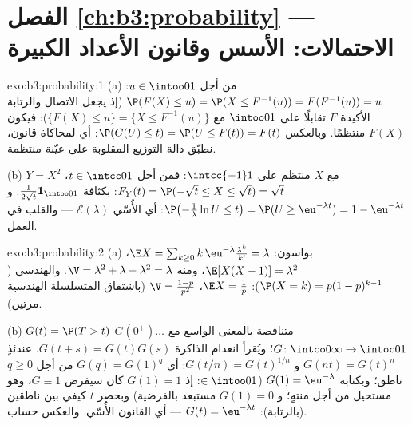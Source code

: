 \section*{الفصل \ref{ch:b3:probability} --- الاحتمالات: الأسس
وقانون الأعداد الكبيرة}

\begin{solution}{exo:b3:probability:1}
(a) من أجل $u \in \intoo01$: $\P(F(X) \leq u) = \P(X \leq
F^{-1}(u)) = F(F^{-1}(u)) = u$ (إذ يجعل الاتصال والرتابة
الأكيدة $F$ تقابلًا على $\intoo01$ مع $\{F(X) \leq u\} = \{X \leq F^{-1}(u)\}$): فيكون $F(X)$
منتظمًا. وبالعكس $\P(G(U) \leq t) = \P(U \leq F(t)) = F(t)$: أي لمحاكاة قانون، نطبّق دالة التوزيع
المقلوبة على عيّنة منتظمة.

(b) $Y = X^2$ مع $X$ منتظم على $\intcc{-1}1$: فمن أجل $t \in
\intcc01$،
$F_Y(t) = \P(-\sqrt t \leq X \leq \sqrt t) = \sqrt
t$: بكثافة $\frac1{2\sqrt t}\mathbf 1_{\intoo01}$. و $\P\bigl(-\frac1\lambda\ln U \leq t\bigr) = \P(U \geq
\eu^{-\lambda t}) = 1 - \eu^{-\lambda t}$: أي الأُسّي $\mathcal E(\lambda)$ --- والقلب في
العمل.
\end{solution}

\begin{solution}{exo:b3:probability:2}
(a) بواسون: $\E X = \sum_{k\geq0}k\,\eu^{-\lambda}
\frac{\lambda^k}{k!} = \lambda$، $\E[X(X-1)] = \lambda^2$، ومنه $\V = \lambda^2 + \lambda - \lambda^2 = \lambda$. والهندسي ($\P(X = k) = p(1-p)^{k-1}$):
$\E X = \frac1p$، $\V =
\frac{1-p}{p^2}$ (باشتقاق المتسلسلة الهندسية مرتين).

(b) $G(t) = \P(T > t)$ متناقصة بالمعنى الواسع مع $G(0^+)\dots$ $G \colon \intco0\infty \to \intoc01$؛
ويُقرأ انعدام الذاكرة $G(t + s) = G(t)G(s)$. عندئذٍ $G(n t) = G(t)^n$ و $G(t/n) =
G(t)^{1/n}$: أي
$G(q) = G(1)^q$ من أجل $q \geq 0$ ناطق؛ وبكتابة $G(1) = \eu^{-\lambda}$
($\in \intoo01$: إذ $G(1) = 1$ كان سيفرض $G \equiv 1$، وهو
مستحيل من أجل  منتهٍ؛ و $G(1) = 0$ مستبعد
بالفرضية) وبحصر $t$ كيفي بين ناطقين (بالرتابة): $G(t) =
\eu^{-\lambda t}$ --- أي
القانون الأُسّي. والعكس حساب.
\end{solution}

